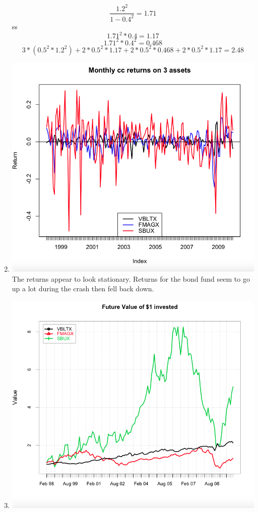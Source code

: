 \documentclass[letterpaper,12pt]{article}
\begin{document}
\begin{enumerate}
\[
	\frac{1.2^2}{1-0.4^2} = 1.71
\]ss
\[
	1.71^2 * 0.4 = 1.17
\]
\[
	1.71^2 * 0.4^2 = 0.468
\]
\[
	3*(0.5^2 * 1.2^2) + 2 * 0.5^2 * 1.17 + 2 * 0.5^2 * 0.468 + 2* 0.5^2 * 1.17 = 2.48
\]
\item \includegraphics[scale = 0.4]{returns}
The returns appear to look stationary. Returns for the bond fund seem to go up a lot during the crash then fell back down. 
\item \includegraphics[scale = 0.4]{cumRet}

\end{enumerate}
\end{document}
